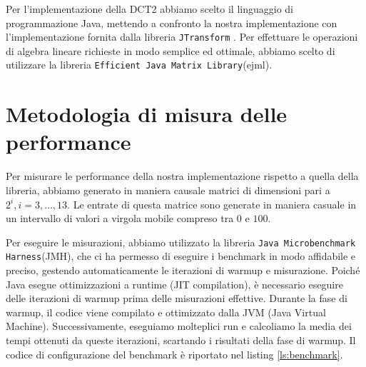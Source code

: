 Per l'implementazione della DCT2 abbiamo scelto il linguaggio 
di programmazione Java, mettendo a confronto la nostra implementazione con
l'implementazione fornita dalla libreria \texttt{JTransform} \cite{wendykier_jtransforms_3_1}.
Per effettuare le operazioni di algebra lineare richieste in modo semplice ed ottimale, abbiamo
scelto di utilizzare la libreria \texttt{Efficient Java Matrix Library}(ejml)\cite{abeles_ejml_0_44_0}.
\section{Metodologia di misura delle performance}
Per misurare le performance della nostra implementazione rispetto a quella della libreria, 
abbiamo generato in maniera causale matrici di dimensioni pari a $2^i, i = 3,\dots,13$.
Le entrate di questa matrice sono generate in maniera casuale in un intervallo di valori a virgola mobile compreso tra $0$ e $100$.

Per eseguire le misurazioni, abbiamo utilizzato la libreria \texttt{Java Microbenchmark Harness}(JMH)\cite{openjdk_jmh}, che ci ha permesso di eseguire i benchmark in modo affidabile e preciso,
gestendo automaticamente le iterazioni di warmup e misurazione.
Poiché Java esegue ottimizzazioni a runtime (JIT compilation),
è necessario eseguire delle iterazioni di warmup prima delle misurazioni effettive.
Durante la fase di warmup, il codice viene compilato e ottimizzato dalla JVM (Java Virtual Machine)\cite{ibm_jit_optimization}.
Successivamente, eseguiamo molteplici run e calcoliamo la media dei tempi ottenuti da queste iterazioni,
scartando i risultati della fase di warmup.
Il codice di configurazione del benchmark è riportato nel listing \ref{ls:benchmark}.
\clearpage

